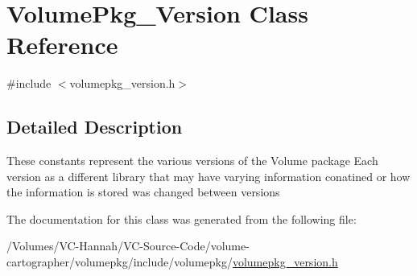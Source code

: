 \hypertarget{classVolumePkg__Version}{}\section{Volume\+Pkg\+\_\+\+Version Class Reference}
\label{classVolumePkg__Version}


{\ttfamily \#include $<$volumepkg\+\_\+version.\+h$>$}



\subsection{Detailed Description}
These constants represent the various versions of the Volume package Each version as a different library that may have varying information conatined or how the information is stored was changed between versions 

The documentation for this class was generated from the following file\+:\begin{DoxyCompactItemize}
\item 
/\+Volumes/\+V\+C-\/\+Hannah/\+V\+C-\/\+Source-\/\+Code/volume-\/cartographer/volumepkg/include/volumepkg/\hyperlink{volumepkg__version_8h}{volumepkg\+\_\+version.\+h}\end{DoxyCompactItemize}
